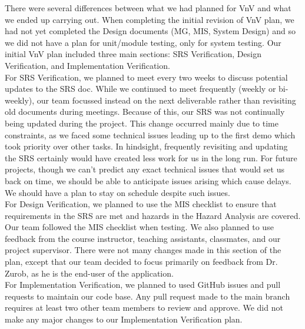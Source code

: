\documentclass[12pt, titlepage]{article}
\begin{document}
\indent There were several differences between what we had planned for VnV and what we ended up carrying out. When completing the initial revision of VnV plan, we had not yet completed the Design documents (MG, MIS, System Design) and so we did not have a plan for unit/module testing, only for system testing. Our initial VnV plan included three main sections: SRS Verification, Design Verification, and Implementation Verification.\\

\indent For SRS Verification, we planned to meet every two weeks to discuss potential updates to the SRS doc. While we continued to meet frequently (weekly or bi-weekly), our team focussed instead on the next deliverable rather than revisiting old documents during meetings. Because of this, our SRS was not continually being updated during the project. This change occurred mainly due to time constraints, as we faced some technical issues leading up to the first demo which took priority over other tasks. In hindsight, frequently revisiting and updating the SRS certainly would have created less work for us in the long run. For future projects, though we can't predict any exact technical issues that would set us back on time, we should be able to anticipate issues arising which cause delays. We should have a plan to stay on schedule despite such issues. \\

\indent  For Design Verification, we planned to use the MIS checklist to ensure that requirements in the SRS are met and hazards in the Hazard Analysis are covered. Our team followed the MIS checklist when testing. We also planned to use feedback from the course instructor, teaching assistants, classmates, and our project supervisor. There were not many changes made in this section of the plan, except that our team decided to focus primarily on feedback from Dr. Zurob, as he is the end-user of the application. \\

\indent For Implementation Verification, we planned to used GitHub issues and pull requests to maintain our code base. Any pull request made to the main branch requires at least two other team members to review and approve. We did not make any major changes to our Implementation Verification plan. 
\end{document}
